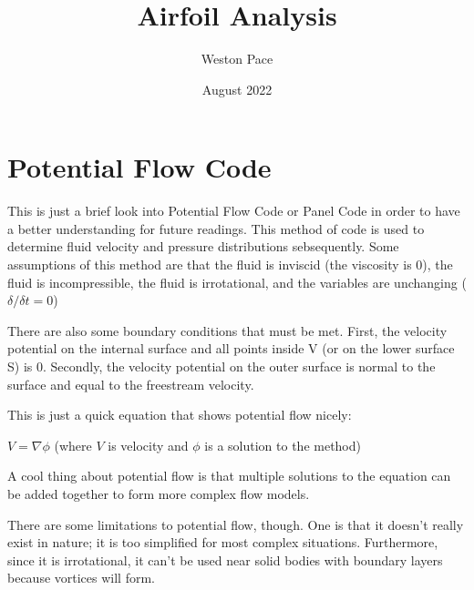 \documentclass[12pt, letterpaper]{article}
\title{Airfoil Analysis}
\author{Weston Pace}
\date{August 2022}
\begin{document}
\maketitle

\section{Potential Flow Code}

This is just a brief look into Potential Flow Code or Panel Code in order to have a better understanding for future readings. 
This method of code is used to determine fluid velocity and pressure distributions sebsequently. Some assumptions of this method are that the fluid is 
inviscid (the viscosity is 0), the fluid is incompressible, the fluid is irrotational, and the variables are unchanging ($\delta/\delta t = 0$)

There are also some boundary conditions that must be met. First, the velocity potential on the internal surface and all points inside V (or on the lower
surface S) is 0. Secondly, the velocity potential on the outer surface is normal to the surface and equal to the freestream velocity.

This is just a quick equation that shows potential flow nicely:

$V = \nabla \phi$ (where $V$ is velocity and $\phi$ is a solution to the method)

A cool thing about potential flow is that multiple solutions to the equation can be added together to form more complex flow models.

There are some limitations to potential flow, though. One is that it doesn't really exist in nature; it is too simplified for most complex situations.
Furthermore, since it is irrotational, it can't be used near solid bodies with boundary layers because vortices will form. 
\end{document}
